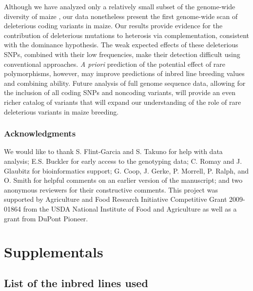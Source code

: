 \documentclass[12pt]{article}
\begin{document}
Although we have analyzed only a relatively small subset of the genome-wide diversity of maize \citep{Chia2012}, our data nonetheless present the first genome-wide scan of deleterious coding variants in maize.  Our results provide evidence for the contribution of deleterious mutations to heterosis via complementation, consistent with the dominance hypothesis. 
The weak expected effects of these deleterious SNPs, combined with their low frequencies, make their detection difficult using conventional approaches. \emph{A priori} prediction of the potential effect of rare polymorphisms, however, may improve predictions of inbred line breeding values and combining ability. Future analysis of full genome sequence data, allowing for the inclusion of all coding SNPs and noncoding variants, will provide an even richer catalog of variants that will expand our understanding of the role of rare deleterious variants in maize breeding.

\subsubsection*{Acknowledgments}
We would like to thank S. Flint-Garcia and S. Takuno for help with data analysis; E.S. Buckler for early access to the genotyping data; C. Romay and J. Glaubitz for bioinformatics support; G. Coop, J. Gerke, P. Morrell, P. Ralph, and O. Smith for helpful comments on an earlier version of the manuscript; 
and two anonymous reviewers for their constructive comments.
This project was supported by Agriculture and Food Research Initiative Competitive Grant 2009-01864 from the USDA National Institute of Food and Agriculture as well as a grant from DuPont Pioneer. 

\clearpage


\clearpage
\setcounter{figure}{0}
\setcounter{table}{0}
\renewcommand{\figurename}{Sup.\, Fig.}
\renewcommand{\tablename}{Sup.\,Table}


\section*{Supplementals}

\subsection*{List of the inbred lines used } 
\end{document}
